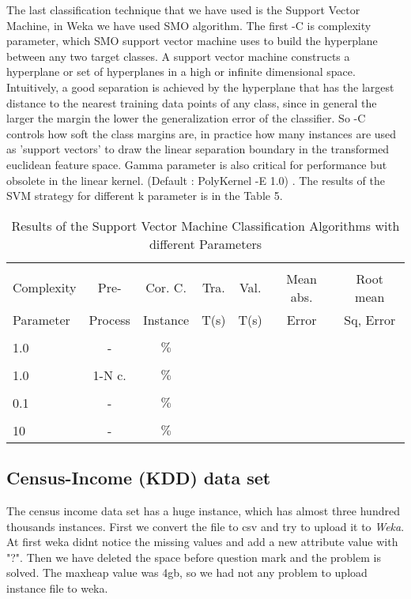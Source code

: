 \documentclass[a4paper]{article}
\begin{document}
The last classification technique that we have used is the Support Vector Machine, in Weka we have used SMO algorithm. The first -C is complexity parameter, which SMO support vector machine uses to
build the hyperplane between any two target classes. A support vector machine constructs a hyperplane or set of hyperplanes in a high or infinite dimensional space. Intuitively, a good separation is achieved by the
hyperplane that has the largest distance to the nearest training data points of any class, since in general the larger the
margin the lower the generalization error of the classifier. So -C controls how soft the class margins are, in
practice how many instances are used as 'support vectors' to draw the linear separation boundary in the transformed euclidean feature space. Gamma parameter is also critical for performance but obsolete in the linear kernel. (Default : PolyKernel -E 1.0) . The results of the  SVM  strategy for different k parameter is in the Table 5.


\begin{table}
\begin{tabular}{|l| c | c | c | c |c |c |}

\hline & & & & & & \\
Complexity & Pre- &  Cor. C. & Tra. & Val. & Mean abs.  & Root mean \\
Parameter & Process & Instance & T(s) &  T(s) & Error & Sq, Error \\
\hline & & & & & & \\
1.0 & - &		   $\%$ &			& 		 & 		 &  \\ 
\hline & & & & & & \\
1.0  & 1-N c. &	   $\%$ &			& 		 & 		  &  \\ 
\hline & & & & & & \\
0.1	& - &			  $\%$ & 		& 		 & 		  &   \\ 
\hline & & & & & & \\
10	 & - &			   $\%$ &   		& 		 &  		 & \\ 
\hline
\end{tabular}
\caption{Results of the Support Vector Machine Classification Algorithms with different Parameters}
\end{table}


\subsection{Census-Income (KDD) data set}

The census income data set has a huge instance, which has almost three hundred thousands  instances. First we convert the file to csv and try to upload it to \emph{Weka}. At first weka didnt notice the missing values and add a new attribute value with "?". Then we have deleted the space before question mark and the problem is solved. The maxheap value was 4gb, so we had not any problem to upload instance file to weka. 
\end{document}
